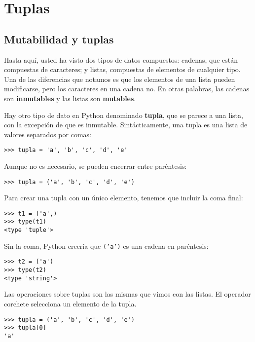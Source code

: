 
\chapter{Tuplas}

\label{tuplechap} 

\section{Mutabilidad y tuplas}

  

Hasta aquí, usted ha visto dos tipos de datos compuestos: cadenas,
que están compuestas de caracteres; y listas, compuestas de elementos
de cualquier tipo. Una de las diferencias que notamos es que los elementos
de una lista pueden modificarse, pero los caracteres en una cadena
no. En otras palabras, las cadenas son \textbf{inmutables} y las listas
son \textbf{mutables}.

 

Hay otro tipo de dato en Python denominado \textbf{tupla}, que se
parece a una lista, con la excepción de que es inmutable. Sintácticamente,
una tupla es una lista de valores separados por comas:
\begin{verbatim}
>>> tupla = 'a', 'b', 'c', 'd', 'e'
\end{verbatim}

Aunque no es necesario, se pueden encerrar entre paréntesis:
\begin{verbatim}
>>> tupla = ('a', 'b', 'c', 'd', 'e')
\end{verbatim}

Para crear una tupla con un único elemento, tenemos que incluir la
coma final:
\begin{verbatim}
>>> t1 = ('a',)
>>> type(t1)
<type 'tuple'>
\end{verbatim}

Sin la coma, Python creería que \texttt{('a')} es una cadena en paréntesis:
\begin{verbatim}
>>> t2 = ('a')
>>> type(t2)
<type 'string'>
\end{verbatim}

Las operaciones sobre tuplas son las mismas que vimos con las listas.
El operador corchete selecciona un elemento de la tupla.
\begin{verbatim}
>>> tupla = ('a', 'b', 'c', 'd', 'e')
>>> tupla[0]
'a'
\end{verbatim}

